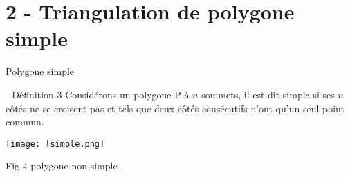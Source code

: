 \documentclass{beamer}
\begin{document}
\section{2 - Triangulation de polygone simple}
\begin{frame}{Polygone simple}
    \begin{block}{- Définition 3}
      Considérons un polygone P à $n$ sommets, il est dit simple si ses $n$ côtés ne se croisent pas et tels que deux côtés consécutifs n’ont qu’un seul point commun.
    \end{block}
    \begin{center}
        \texttt{[image: !simple.png]}
            
        Fig 4 polygone non simple
    \end{center}
\end{frame}
\end{document}
